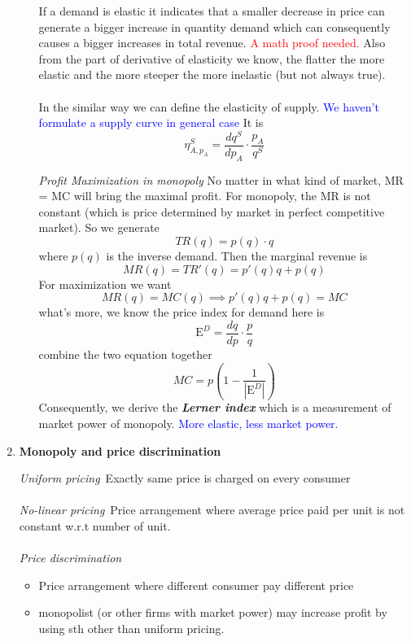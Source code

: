 \documentclass[10pt]{article}
\newenvironment{changemargin}[2]{%
  \begin{list}{}{%
    \setlength{\topsep}{0pt}%
    \setlength{\leftmargin}{#1}%
    \setlength{\rightmargin}{#2}%
    \setlength{\listparindent}{\parindent}%
    \setlength{\itemindent}{\parindent}%
    \setlength{\parsep}{\parskip}%
  }%
  \item[]}{\end{list}}
\begin{document}
\begin{changemargin}{-0.125in}{0in}
\begin{enumerate}
\begin{enumerate}
        If a demand is elastic it indicates that a smaller decrease in price can generate a bigger increase in quantity demand which can consequently causes a bigger increases in total revenue. \textcolor{red}{A math proof needed. } Also from the part of derivative of elasticity we know, the flatter the more elastic and the more steeper the more inelastic (but not always true).
        \\
        \\
        In the similar way we can define the elasticity of supply. \textcolor{blue}{We haven't formulate a supply curve in general case} It is 
        \[
        \eta^S_{A,p_A} = \frac{dq^S}{dp_A}\cdot \frac{p_A}{q^S}
        \]
        
        \medskip
        
        \textit{Profit Maximization in monopoly}\;\;\;\; No matter in what kind of market, MR = MC will bring the maximal profit. For monopoly, the MR is not constant (which is price determined by market in perfect competitive market). So we generate 
        \[
        TR(q) = p(q)\cdot q  
        \]
        where $p(q)$ is the inverse demand. Then the marginal revenue is 
        \[
        MR(q) = TR'(q) = p'(q)q+p(q)
        \]
        For maximization we want
        \[
        MR(q) = MC(q)  \implies p'(q)q+p(q) = MC
        \]
        what's more, we know the price index for demand here is 
        \[
        \mathrm{E}^D = \frac{dq}{dp}\cdot\frac{p}{q}
        \]
        combine the two equation together 
        \[
        MC = p(1 - \frac{1}{|\mathrm{E}^D|})
        \]
        Consequently, we derive the \textbf{\textit{Lerner index}} which is a measurement of market power of monopoly. \textcolor{blue}{More elastic, less market power.}
                                
                                   	
                  \end{enumerate}
                  
                  \bigskip
                  
                  \item 
    \textbf{Monopoly and price discrimination}
    
    \medskip
    
    \textit{Uniform pricing}\,\,\,Exactly same price is charged on every consumer
    \\
    \\
    \textit{No-linear pricing}\,\,\,Price arrangement where average price paid per unit is not constant w.r.t number of unit.
     \\
     \\
     \textit{Price discrimination}
     \begin{itemize}
         \item Price arrangement where different consumer pay different price
         \item monopolist (or other firms with market power) may increase profit by using sth other than uniform pricing.
     \end{itemize}
     

\end{enumerate}
\end{changemargin}
\end{document}
